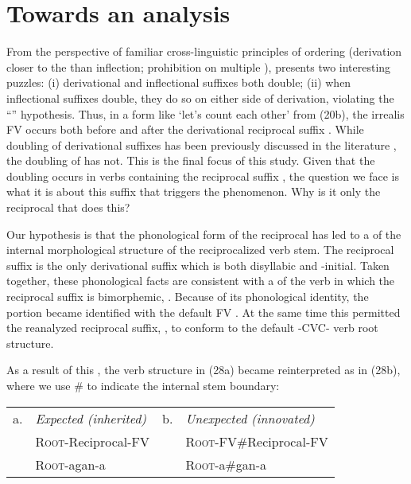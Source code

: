 \documentclass[output=paper,
modfonts
]{LSP/langsci}
\begin{document}
\section{Towards an analysis}\label{sec:hyman:5}

From the perspective of familiar cross-linguistic principles of 
ordering (derivation closer to the  than inflection; prohibition on
multiple ),  presents two interesting puzzles: (i)
derivational and inflectional suffixes both double; (ii) when
inflectional suffixes double, they do so on either side of derivation,
violating the ``'' hypothesis. Thus, in a form like
\form{tù-{[}bàl-é-gàn-é} `let's count each other' from (20b), the
irrealis FV  occurs both before and after the derivational
reciprocal suffix . While doubling of derivational suffixes
has been previously discussed in the  literature \citep{hyman2003}, the
doubling of  has not. This is the final focus of this study.
Given that the doubling occurs in verbs containing the reciprocal suffix
, the question we face is what it is about this suffix that
triggers the phenomenon. Why is it only the reciprocal that does this?

Our hypothesis is that the phonological form of the reciprocal has led
to a  of the internal morphological structure of the
reciprocalized  verb stem. The reciprocal suffix  is
the only  derivational suffix which is both disyllabic and
-initial. Taken together, these phonological facts are
consistent with a  of the verb  in which the reciprocal
suffix is bimorphemic, . Because of its phonological
identity, the  portion became identified with the default FV
. At the same time this permitted the reanalyzed reciprocal
suffix, , to conform to the default -CVC- verb root
structure.

As a result of this , the verb structure in (28a) became
reinterpreted as in (28b), where we use \# to indicate the internal stem
boundary:

\ea\begin{tabular}[t]{@{}llrl}
a. & \emph{Expected (inherited)} & b. &  \emph{Unexpected (innovated)}  \\
& \textsc{Root}-Reciprocal-FV & & \textsc{Root}-FV\#Reciprocal-FV \\
 & \textsc{Root}-agan-a & & \textsc{Root}-a\#gan-a
\end{tabular}
\z
\end{document}
